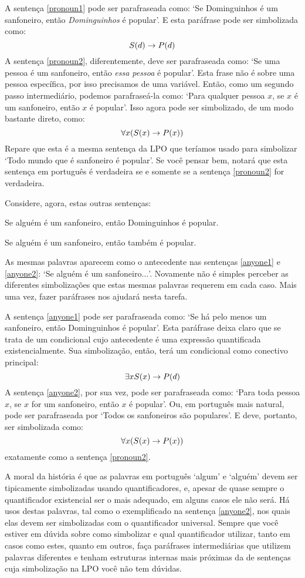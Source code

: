 A sentença \ref{pronoun1} pode ser parafraseada como: `Se Dominguinhos é um sanfoneiro, então \emph{Dominguinhos} é popular'. E esta paráfrase pode ser simbolizada como:
$$\mathord{S}(d) \rightarrow \mathord{P}(d)$$
A sentença \ref{pronoun2}, diferentemente, deve ser parafraseada como:
`Se uma pessoa é um sanfoneiro, então \emph{essa pessoa} é popular'.
Esta frase não é sobre uma pessoa específica, por isso precisamos de uma variável.
Então, como um segundo passo intermediário, podemos parafraseá-la como:
`Para qualquer pessoa $x$, se $x$ é um sanfoneiro, então $x$ é popular'.
Isso agora pode ser simbolizado, de um modo bastante direto, como:
$$\forall x (\mathord{S}(x) \rightarrow \mathord{P}(x))$$
Repare que esta é a mesma sentença da LPO que teríamos usado para simbolizar `Todo mundo que é sanfoneiro é popular'.
Se você pensar bem, notará que esta sentença em português é verdadeira se e somente se a sentença \ref{pronoun2} for verdadeira.

Considere, agora, estas outras sentenças:
	\begin{earg}
		\item[\ex{anyone1}] Se alguém é um sanfoneiro, então Dominguinhos é popular.
		\item[\ex{anyone2}] Se alguém é um sanfoneiro, então também é popular.
	\end{earg}
As mesmas palavras aparecem como o antecedente nas sentenças \ref{anyone1} e \ref{anyone2}: `Se alguém é um sanfoneiro$\ldots$'.
Novamente não é simples perceber as diferentes simbolizações que estas mesmas palavras requerem em cada caso.
Mais uma vez, fazer paráfrases nos ajudará nesta tarefa. 

A sentença \ref{anyone1} pode ser parafraseada como: `Se há pelo menos um sanfoneiro, então Dominguinhos é popular'.
Esta paráfrase deixa claro que se trata de um condicional cujo antecedente é uma expressão quantificada existencialmente.
Sua simbolização, então, terá um condicional como conectivo principal:
$$\exists x \mathord{S}(x) \rightarrow \mathord{P}(d)$$
A sentença \ref{anyone2}, por sua vez, pode ser parafraseada como:
`Para toda pessoa $x$, se $x$ for um sanfoneiro, então $x$ é popular'.
Ou, em português mais natural, pode ser parafraseada por `Todos os sanfoneiros são populares'.
E deve, portanto, ser simbolizada como:
$$\forall x(\mathord{S}(x) \rightarrow \mathord{P}(x))$$
exatamente como a sentença \ref{pronoun2}.

A moral da história é que as palavras em português `algum' e `alguém' devem ser tipicamente simbolizadas usando quantificadores, e, apesar de quase sempre o quantificador existencial ser o mais adequado, em alguns casos ele não será.
Há usos destas palavras, tal como o exemplificado na sentença \ref{anyone2}, nos quais elas devem ser simbolizadas com o quantificador universal.
Sempre que você estiver em dúvida sobre como simbolizar e qual quantificador utilizar, tanto em casos como estes, quanto em outros, faça paráfrases intermediárias que utilizem palavras diferentes e tenham estruturas internas mais próximas da de sentenças cuja simbolização na LPO você não tem dúvidas.


